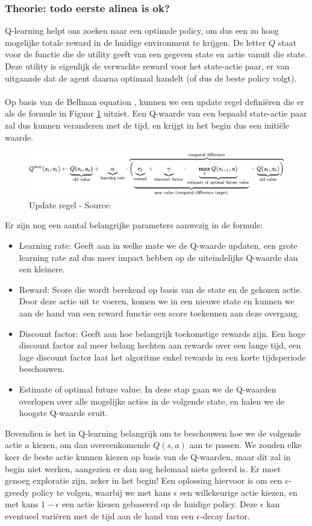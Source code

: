\documentclass[11pt]{article}
\begin{document}
\subsubsection{Theorie: todo eerste alinea is ok?}
Q-learning helpt ons zoeken naar een optimale policy, om dus een zo hoog mogelijke totale reward in de huidige environment te krijgen. De letter $Q$ staat voor de functie die de utility geeft van een gegeven state en actie vanuit die state. Deze utility is eigenlijk de verwachte reward voor het state-actie paar, er van uitgaande dat de agent daarna optimaal handelt (of dus de beste policy volgt).\\\\
Op basis van de Bellman equation \cite{bellman-equations}, kunnen we een update regel definiëren die er als de formule in Figuur \ref{fig:qfunction} uitziet. Een Q-waarde van een bepaald state-actie paar zal dus kunnen veranderen met de tijd, en krijgt in het begin dus een initiële waarde.
\begin{figure}[H]
\centering
\includegraphics[scale=0.70]{images/qformula.png}
\caption{Update regel - Source: \cite{q-learning}}
\label{fig:qfunction}
\end{figure}
\noindent Er zijn nog een aantal belangrijke parameters aanwezig in de formule: 
\begin{itemize}
	\item Learning rate: Geeft aan in welke mate we de Q-waarde updaten, een grote learning rate zal dus meer impact hebben op de uiteindelijke Q-waarde dan een kleinere.
	\item Reward: Score die wordt berekend op basis van de state en de gekozen actie. Door deze actie uit te voeren, komen we in een nieuwe state en kunnen we aan de hand van een reward functie een score toekennen aan deze overgang. 
	\item Discount factor: Geeft aan hoe belangrijk toekomstige rewards zijn. Een hoge discount factor zal meer belang hechten aan rewards over een lange tijd, een lage discount factor laat het algoritme enkel rewards in een korte tijdsperiode beschouwen.
	\item Estimate of optimal future value: In deze stap gaan we de Q-waarden overlopen over alle mogelijke acties in de volgende state, en halen we de hoogste Q-waarde eruit.
\end{itemize}
Bovendien is het in Q-learning belangrijk om te beschouwen hoe we de volgende actie $a$ kiezen, om dan overeenkomende $Q(s,a)$ aan te passen. We zouden elke keer de beste actie kunnen kiezen op basis van de Q-waarden, maar dit zal in begin niet werken, aangezien er dan nog helemaal niets geleerd is. Er moet genoeg exploratie zijn, zeker in het begin! Een oplossing hiervoor is om een $\epsilon$-greedy policy te volgen, waarbij we met kans $\epsilon$ een willekeurige actie kiezen, en met kans $1-\epsilon$ een actie kiezen gebaseerd op de huidige policy. Deze $\epsilon$ kan eventueel variëren met de tijd aan de hand van een $\epsilon$-decay factor.
\end{document}
